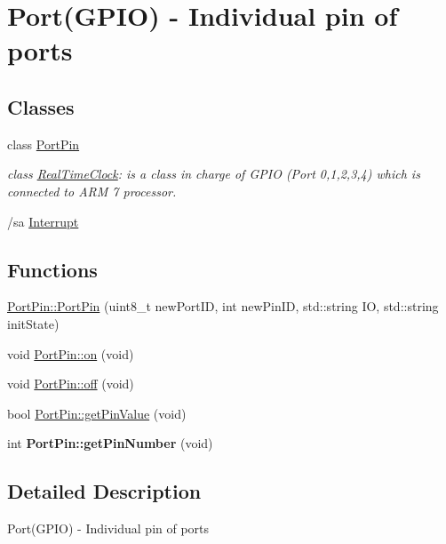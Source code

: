 \hypertarget{group__group7}{
\section{Port(GPIO) -\/ Individual pin of ports}
\label{group__group7}
}
\subsection*{Classes}
\begin{DoxyCompactItemize}
\item 
class \hyperlink{class_port_pin}{PortPin}
\begin{DoxyCompactList}\small\item\em class \hyperlink{class_real_time_clock}{RealTimeClock}: is a class in charge of GPIO (Port 0,1,2,3,4) which is connected to ARM 7 processor.

/sa \hyperlink{class_interrupt}{Interrupt} \end{DoxyCompactList}\end{DoxyCompactItemize}
\subsection*{Functions}
\begin{DoxyCompactItemize}
\item 
\hyperlink{group__group7_gae4b6c1ca5935d5e3d68253490cae00a8}{PortPin::PortPin} (uint8\_\-t newPortID, int newPinID, std::string IO, std::string initState)
\item 
void \hyperlink{group__group7_ga7dfeaef858c6fadac016106aac028278}{PortPin::on} (void)
\item 
void \hyperlink{group__group7_ga779ca8e89b76bff26659244a4e4888a7}{PortPin::off} (void)
\item 
bool \hyperlink{group__group7_gabc0f706193ead5769118388757374e85}{PortPin::getPinValue} (void)
\item 
\hypertarget{group__group7_ga965a0cef4266fee8909e7b5998b1bae8}{
int {\bfseries PortPin::getPinNumber} (void)}
\label{group__group7_ga965a0cef4266fee8909e7b5998b1bae8}

\end{DoxyCompactItemize}


\subsection{Detailed Description}
Port(GPIO) -\/ Individual pin of ports 


